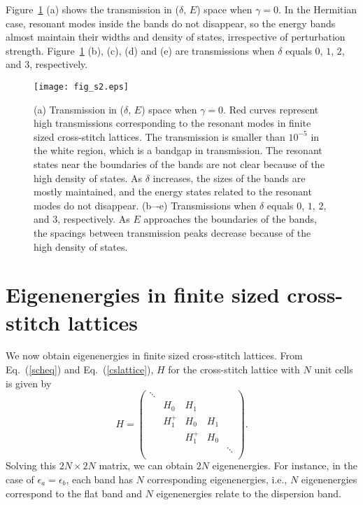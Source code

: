 \documentclass[report,epsfig,pre]{revtex4}
\newcommand{\figsizeone}{0.48}
\begin{document}
Figure~\ref{fig_s2} (a) shows the transmission in ($\delta$, $E$) space when $\gamma = 0$. In the Hermitian case, resonant modes inside the bands do not disappear, so the energy bands almost maintain their widths and density of states, irrespective of perturbation strength. Figure~\ref{fig_s2} (b), (c), (d) and (e) are transmissions when $\delta$ equals $0$, $1$, $2$, and $3$, respectively.


\begin{figure}
\begin{center}
\texttt{[image: fig\_s2.eps]}
\caption{
(a) Transmission in ($\delta$, $E$) space when $\gamma = 0$.
Red curves represent high transmissions corresponding to the resonant modes in finite sized cross-stitch lattices. The transmission is smaller than $10^{-5}$ in the white region, which is a bandgap in transmission.
The resonant states near the boundaries of the bands are not clear because of the high density of states.
As $\delta$ increases, the sizes of the bands are mostly maintained, and the energy states related to the resonant modes do not disappear.
(b–-e) Transmissions when $\delta$ equals $0$, $1$, $2$, and $3$, respectively. As $E$ approaches the boundaries of the bands, the spacings between transmission peaks decrease because of the high density of states.
}
\label{fig_s2}
\end{center}
\end{figure}

\section{Eigenenergies in finite sized cross-stitch lattices}

We now obtain eigenenergies in finite sized cross-stitch lattices.
From Eq.~(\ref{scheq}) and Eq.~(\ref{cslattice}), $H$ for the cross-stitch lattice with $N$ unit cells is given by
\begin{equation}
 H = \left(\begin{array}{ccccc}
 \ddots & & & & \\
  & H_0 & H_1 & &  \\
  & H_1^+ & H_0 & H_1 &   \\
  & & H_1^+ & H_0 &  \\
  & & & & \ddots   \\
\end{array}\right).
\end{equation}
Solving this $2N \times 2N$ matrix, we can obtain $2N$ eigenenergies.
For instance, in the case of $\epsilon_a=\epsilon_b$, each band has $N$ corresponding eigenenergies, i.e., $N$ eigenenergies correspond to the flat band and $N$ eigenenergies relate to the dispersion band.
\end{document}
